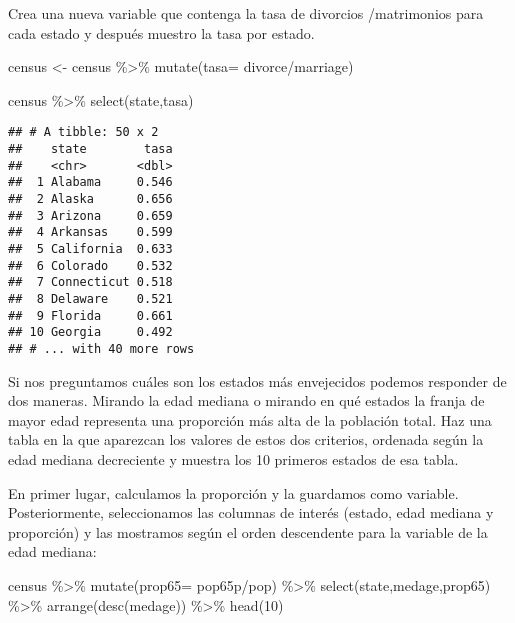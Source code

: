 \documentclass[
]{article}
\newenvironment{Shaded}{\begin{snugshade}}{\end{snugshade}}
\newcommand{\AttributeTok}[1]{\textcolor[rgb]{0.77,0.63,0.00}{#1}}
\newcommand{\DecValTok}[1]{\textcolor[rgb]{0.00,0.00,0.81}{#1}}
\newcommand{\FunctionTok}[1]{\textcolor[rgb]{0.00,0.00,0.00}{#1}}
\newcommand{\NormalTok}[1]{#1}
\newcommand{\OtherTok}[1]{\textcolor[rgb]{0.56,0.35,0.01}{#1}}
\newcommand{\SpecialCharTok}[1]{\textcolor[rgb]{0.00,0.00,0.00}{#1}}
\begin{document}
Crea una nueva variable que contenga la tasa de divorcios /matrimonios
para cada estado y después muestro la tasa por estado.

\begin{Shaded}
\begin{Highlighting}[]
\NormalTok{census }\OtherTok{\textless{}{-}}\NormalTok{ census }\SpecialCharTok{\%\textgreater{}\%} 
  \FunctionTok{mutate}\NormalTok{(}\AttributeTok{tasa=}\NormalTok{ divorce}\SpecialCharTok{/}\NormalTok{marriage) }

\NormalTok{census }\SpecialCharTok{\%\textgreater{}\%} 
  \FunctionTok{select}\NormalTok{(state,tasa)}
\end{Highlighting}
\end{Shaded}

\begin{verbatim}
## # A tibble: 50 x 2
##    state        tasa
##    <chr>       <dbl>
##  1 Alabama     0.546
##  2 Alaska      0.656
##  3 Arizona     0.659
##  4 Arkansas    0.599
##  5 California  0.633
##  6 Colorado    0.532
##  7 Connecticut 0.518
##  8 Delaware    0.521
##  9 Florida     0.661
## 10 Georgia     0.492
## # ... with 40 more rows
\end{verbatim}

Si nos preguntamos cuáles son los estados más envejecidos podemos
responder de dos maneras. Mirando la edad mediana o mirando en qué
estados la franja de mayor edad representa una proporción más alta de la
población total. Haz una tabla en la que aparezcan los valores de estos
dos criterios, ordenada según la edad mediana decreciente y muestra los
10 primeros estados de esa tabla.

En primer lugar, calculamos la proporción y la guardamos como variable.
Posteriormente, seleccionamos las columnas de interés (estado, edad
mediana y proporción) y las mostramos según el orden descendente para la
variable de la edad mediana:

\begin{Shaded}
\begin{Highlighting}[]
\NormalTok{census }\SpecialCharTok{\%\textgreater{}\%} 
  \FunctionTok{mutate}\NormalTok{(}\AttributeTok{prop65=}\NormalTok{ pop65p}\SpecialCharTok{/}\NormalTok{pop) }\SpecialCharTok{\%\textgreater{}\%} 
  \FunctionTok{select}\NormalTok{(state,medage,prop65) }\SpecialCharTok{\%\textgreater{}\%} 
  \FunctionTok{arrange}\NormalTok{(}\FunctionTok{desc}\NormalTok{(medage)) }\SpecialCharTok{\%\textgreater{}\%} 
  \FunctionTok{head}\NormalTok{(}\DecValTok{10}\NormalTok{)}
\end{Highlighting}
\end{Shaded}
\end{document}
